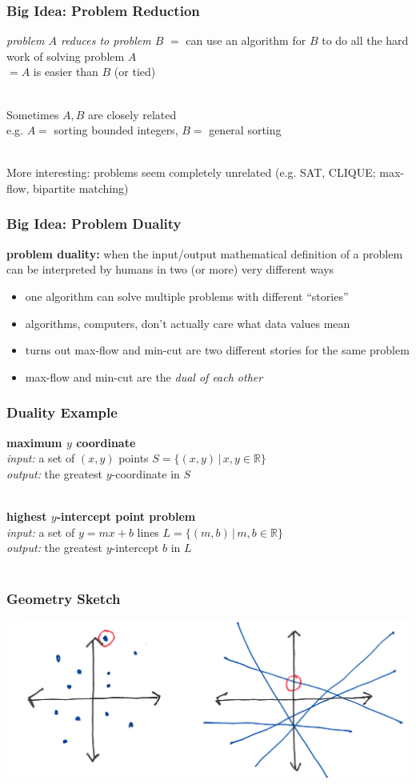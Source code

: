 \documentclass{beamer}
\newcommand{\stanza}{ \\~\ }
\begin{document}
\begin{frame} \frametitle{Big Idea: Problem Reduction}
\emph{problem $A$ reduces to problem $B$} $=$ can use an algorithm for $B$ to do all the hard
work of solving problem $A$ \\
$= A$ is easier than $B$ (or tied) \stanza

Sometimes $A, B$ are closely related \\
e.g. $A = $ sorting bounded integers, $B = $ general sorting \stanza

More interesting: problems seem completely unrelated (e.g. SAT, CLIQUE;
max-flow, bipartite matching)
\end{frame}

\begin{frame} \frametitle{Big Idea: Problem Duality}
\textbf{problem duality:} when the input/output mathematical definition of a
problem can be interpreted by humans in two (or more) very different ways
\begin{itemize}
  \item one algorithm can solve multiple problems with different ``stories''
  \item algorithms, computers, don't actually care what data values mean
  \item turns out max-flow and min-cut are two different stories for the same problem
  \item max-flow and min-cut are the \emph{dual of each other}
\end{itemize}
\end{frame}

\begin{frame} \frametitle{Duality Example}
\textbf{maximum $y$ coordinate} \\
\emph{input: } a set of $(x, y)$ points $S=\{(x, y) \, | \, x, y \in \mathbb{R} \}$ \\
\emph{output: } the greatest $y$-coordinate in $S$ \stanza

\textbf{highest $y$-intercept point problem} \\
\emph{input: } a set of $y=mx+b$ lines $L=\{(m, b) \, | \, m, b \in \mathbb{R} \}$ \\
\emph{output: } the greatest $y$-intercept $b$ in $L$ \stanza
\end{frame}

\begin{frame} \frametitle{Geometry Sketch}
\begin{center}
\includegraphics{lines.png}
\end{center}
\end{frame}
\end{document}
